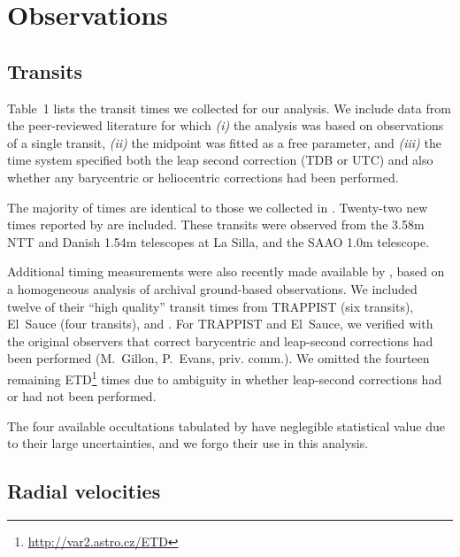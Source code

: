 \documentclass[12pt,twocolumn,tighten]{aastex62}
\begin{document}
\section{Observations}
\label{sec:observations}

\subsection{Transits}

Table~1 lists the transit times we collected for our analysis.  We
include data from the peer-reviewed literature for which {\it (i)} the
analysis was based on observations of a single transit, {\it (ii)} the
midpoint was fitted as a free parameter, and {\it (iii)} the time
system specified both the leap second correction (TDB or UTC) and also
whether any barycentric or heliocentric corrections had been
performed.

The majority of times are identical to those we collected in
.  Twenty-two new times reported by
\citet{southworth_transit_2019} are included.  These transits were
observed from the 3.58m NTT and Danish 1.54m telescopes at La Silla,
and the SAAO 1.0m telescope.

Additional timing measurements were also recently made available by
\citet{baluev_2019}, based on a homogeneous analysis of archival
ground-based observations.
We included twelve of their ``high quality'' transit times from
TRAPPIST (six transits), El~Sauce (four transits), and
\citet{petrucci_no_2013}.  For TRAPPIST and El~Sauce, we verified with
the original observers that correct barycentric and leap-second
corrections had been performed (M.~Gillon, P.~Evans, priv{.} comm{.}).
We omitted the fourteen remaining \citeauthor{baluev_2019}
ETD\footnote{\url{http://var2.astro.cz/ETD}} times due to ambiguity in
whether leap-second corrections had or had not been performed.

The four available occultations tabulated by
 have neglegible statistical value due
to their large uncertainties, and we forgo their use in this analysis.

\subsection{Radial velocities}
\end{document}
